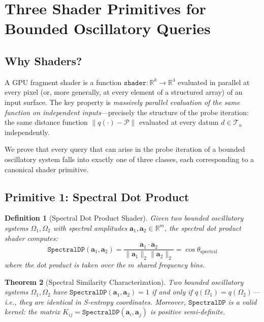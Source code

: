 \documentclass[10pt,twocolumn]{article}
\newtheorem{theorem}{Theorem}[section]
\newtheorem{definition}[theorem]{Definition}
\newcommand{\R}{\mathbb{R}}
\newcommand{\TruthCell}{\mathcal{T}}
\newcommand{\PurposePoint}{\mathcal{P}}
\begin{document}
\section{Three Shader Primitives for Bounded Oscillatory Queries}
\label{sec:shader}

\subsection{Why Shaders?}

A GPU fragment shader is a function $\mathtt{shader} : \R^k \to \R^4$
evaluated in parallel at every pixel (or, more generally, at every element
of a structured array) of an input surface.
The key property is \emph{massively parallel evaluation of the same function
on independent inputs}---precisely the structure of the probe iteration:
the same distance function $\|q(\cdot) - \PurposePoint\|$ evaluated at every
datum $d \in \TruthCell_n$ independently.

We prove that every query that can arise in the probe iteration
of a bounded oscillatory system falls into exactly one of three classes,
each corresponding to a canonical shader primitive.

\subsection{Primitive 1: Spectral Dot Product}

\begin{definition}[Spectral Dot Product Shader]
\label{def:spectral-dot}
Given two bounded oscillatory systems $\Omega_1, \Omega_2$ with
spectral amplitudes $\mathbf{a}_1, \mathbf{a}_2 \in \R^m$,
the \emph{spectral dot product shader} computes:
\begin{equation}
\mathtt{SpectralDP}(\mathbf{a}_1, \mathbf{a}_2) = \frac{\mathbf{a}_1 \cdot \mathbf{a}_2}{\|\mathbf{a}_1\|_2 \|\mathbf{a}_2\|_2}
= \cos\theta_{\text{spectral}}
\label{eq:spectral-dp}
\end{equation}
where the dot product is taken over the $m$ shared frequency bins.
\end{definition}

\begin{theorem}[Spectral Similarity Characterization]
\label{thm:spectral-dp}
Two bounded oscillatory systems $\Omega_1, \Omega_2$ have
$\mathtt{SpectralDP}(\mathbf{a}_1, \mathbf{a}_2) = 1$ if and only if
$q(\Omega_1) = q(\Omega_2)$---i.e., they are identical in S-entropy coordinates.
Moreover, $\mathtt{SpectralDP}$ is a valid kernel:
the matrix $K_{ij} = \mathtt{SpectralDP}(\mathbf{a}_i, \mathbf{a}_j)$
is positive semi-definite.
\end{theorem}
\end{document}
